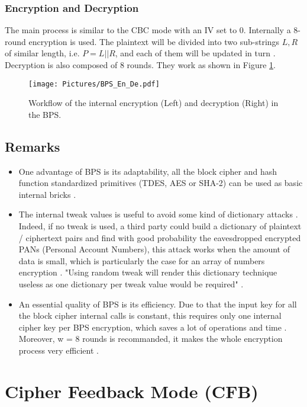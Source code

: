 \subsubsection*{Encryption and Decryption}
The main process is similar to the CBC mode with an IV set to 0.
Internally a 8-round encryption is used. The plaintext will be divided into two sub-strings $L,R$ of similar length, i.e. $P=L||R$, and each of them will be updated in turn \cite{BPS}. Decryption is also composed of 8 rounds. They work as shown in Figure \ref{BPSED}.\\
\begin{figure}[htp]
\center
\texttt{[image: Pictures/BPS\_En\_De.pdf]} 
\caption{Workflow of the internal encryption (Left) and decryption (Right) in the BPS. \cite{BPS}}\label{BPSED}
\center
\end{figure}
\subsection*{Remarks}
\begin{itemize}
\item One advantage of BPS is its adaptability, all the block cipher and hash
function standardized primitives (TDES, AES or SHA-2) can be used as basic internal bricks \cite{BPS}. 
\item The internal tweak values is useful to avoid some kind of dictionary attacks \cite{BPS}. Indeed, if no tweak is used, a third party could build a dictionary of plaintext / ciphertext pairs and find with good probability the eavesdropped encrypted PANs (Personal Account Numbers), this attack works when the amount of data is small, which is particularly the case for an array of numbers encryption \cite{BPS}. "Using random tweak will render this dictionary technique useless as one dictionary per tweak value would be required" \cite{BPS}.
\item An essential quality of BPS is its efficiency. Due to that the input key for all the block cipher internal calls is constant, this requires only one internal cipher key per BPS encryption, which saves a lot of operations and time \cite{BPS}. Moreover, w = 8 rounds is recommanded, it makes the whole encryption process very efficient \cite{BPS}.
\end{itemize}
\section{Cipher Feedback Mode (CFB)}\label{CipherFeedbackMode}
